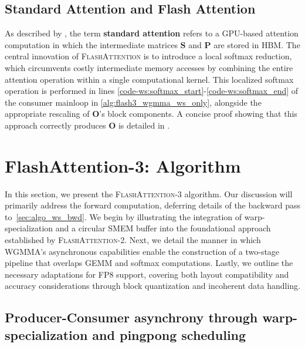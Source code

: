 \subsection{Standard Attention and Flash Attention} As described by \citet{dao2022flashattention}, the term \textbf{standard attention} refers to a GPU-based attention computation in which the intermediate matrices $\mathbf{S}$ and $\mathbf{P}$ are stored in HBM. The central innovation of \textsc{FlashAttention} is to introduce a local softmax reduction, which circumvents costly intermediate memory accesses by combining the entire attention operation within a single computational kernel. This localized softmax operation is performed in lines \ref{code-ws:softmax_start}-\ref{code-ws:softmax_end} of the consumer mainloop in \cref{alg:flash3_wgmma_ws_only}, alongside the appropriate rescaling of $\mathbf{O}$'s block components. A concise proof showing that this approach correctly produces $\mathbf{O}$ is detailed in \cite[\S 2.3.1]{dao2023flashattention2}.

\section{FlashAttention-3: Algorithm}
\label{sec:algo}

In this section, we present the \textsc{FlashAttention-3} algorithm. Our discussion will primarily address the forward computation, deferring details of the backward pass to~\cref{sec:algo_ws_bwd}. We begin by illustrating the integration of warp-specialization and a circular SMEM buffer into the foundational approach established by \textsc{FlashAttention-2}. Next, we detail the manner in which WGMMA’s asynchronous capabilities enable the construction of a two-stage pipeline that overlaps GEMM and softmax computations. Lastly, we outline the necessary adaptations for FP8 support, covering both layout compatibility and accuracy considerations through block quantization and incoherent data handling.

\subsection{Producer-Consumer asynchrony through warp-specialization and pingpong scheduling}
\label{sec:algo_ws}


